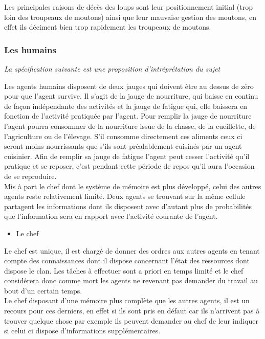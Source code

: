 \documentclass[12pt]{article}
\begin{document}
Les principales raisons de décès des loups sont leur positionnement initial 
(trop loin des troupeaux de moutons) ainsi que leur mauvaise gestion des 
moutons, en effet ils déciment bien trop rapidement les troupeaux de moutons.\\

		\subsubsection{Les humains}

\textit{La spécification suivante est une proposition d'intréprétation du 
sujet}

Les agents humains disposent de deux jauges qui doivent être au dessus de 
zéro pour que l'agent survive. Il s'agit de la jauge de nourriture, qui baisse 
en continu de façon indépendante des activités et la jauge de fatigue qui, 
elle baissera en fonction de l'activité pratiquée par l'agent. Pour remplir 
la jauge de nourriture l'agent pourra consommer de la nourriture issue de la 
chasse, de la cueillette, de l'agriculture ou de l'élevage. S'il consomme 
directement ces aliments ceux ci seront moins nourrissants que s'ils sont 
préalablement cuisinés par un agent cuisinier. Afin de remplir sa jauge de 
fatigue l'agent peut cesser l'activité qu'il pratique et se reposer, c'est 
pendant cette période de repos qu'il aura l'occasion de se reproduire.\\

Mis à part le chef dont le système de mémoire est plus développé, celui des 
autres agents reste relativement limité. Deux agents se trouvant sur la même 
cellule partagent les informations dont ils disposent avec d'autant plus de 
probabilités que l'information sera en rapport avec l'activité courante de 
l'agent.

		\begin{itemize}
		\item Le chef\\
		\end{itemize}

Le chef est unique, il est chargé de donner des ordres aux autres agents en 
tenant compte des connaissances dont il dispose concernant l'état des 
ressources dont dispose le clan. Les tâches à effectuer sont a priori en temps 
limité et le chef considérera donc comme mort les agents ne revenant pas 
demander du travail au bout d'un certain temps.\\

Le chef disposant d'une mémoire plus complète que les autres agents, il est un 
recours pour ces derniers, en effet si ils sont pris en défaut car ils 
n'arrivent pas à trouver quelque chose par exemple ils peuvent demander au 
chef de leur indiquer si celui ci dispose d'informations supplémentaires.\\
\end{document}
